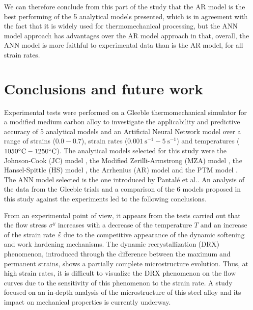 \documentclass[twoside,english,1p,final,sort&compress]{elsarticle}
\makeatletter
\theoremstyle{plain}
\DeclareRobustCommand{\mdot}[1]{\accentset{\mbox{\bfseries .}}{#1}}
\DeclareRobustCommand{\eal}{et al.\@\xspace}
\DeclareRobustCommand{\ps}{\text{s}^{-1}}
\makeatother
\begin{document}
We can therefore conclude from this part of the study that the AR model is the best performing of the 5 analytical models presented, which is in agreement with the fact that it is widely used for thermomechanical processing, but the ANN model approach has advantages over the AR model approach in that, overall, the ANN model is more faithful to experimental data than is the AR model, for all strain rates.

\section{Conclusions and future work\label{sec:Conclusion}}

Experimental tests were performed on a Gleeble thermomechanical simulator for a modified medium carbon alloy to investigate the applicability and predictive accuracy of 5 analytical models and an Artificial Neural Network model over a range of strains ($0.0-0.7$), strain rates ($0.001~\ps-5~\ps$) and temperatures ($1050\celsius-1250\celsius$).
The analytical models selected for this study were the Johnson-Cook (JC) model \cite{Johnson-1983}, the Modified Zerilli-Armstrong (MZA) model \cite{Samantaray-2009}, the Hansel-Spittle (HS) model \cite{Hensel-1978}, the Arrhenius (AR) model \cite{Sellars-1966} and the PTM model \cite{TizeMha-2022}.
The ANN model selected is the one introduced by Pantalé \eal \cite{Pantale-2021}.
An analysis of the data from the Gleeble trials and a comparison of the 6 models proposed in this study against the experiments led to the following conclusions.

From an experimental point of view, it appears from the tests carried out that the flow stress $\sigma^y$ increases with a decrease of the temperature $T$ and an increase of the strain rate $\mdot\varepsilon$ due to the competitive appearance of the dynamic softening and work hardening mechanisms.
The dynamic recrystallization (DRX) phenomenon, introduced through the difference between the maximum and permanent strains, shows a partially complete microstructure evolution.
Thus, at high strain rates, it is difficult to visualize the DRX phenomenon on the flow curves due to the sensitivity of this phenomenon to the strain rate.
A study focused on an in-depth analysis of the microstructure of this steel alloy and its impact on mechanical properties is currently underway.
\end{document}
